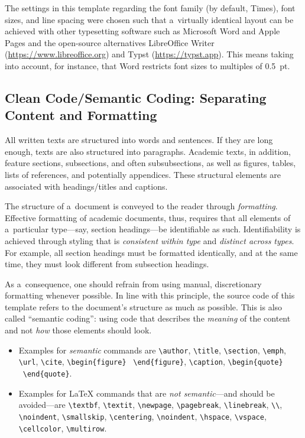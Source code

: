 \documentclass[12pt, a4paper, oneside]{article}
\newlength{\smalllinespacing}
\renewenvironment{quote}{%
	\par\list{}{%
		\leftmargin = \baselineskip%
		\rightmargin = \leftmargin%
		\baselineskip = \smalllinespacing%
	}
	\item\relax%
}{%
	\endlist%
}
\theoremstyle{Plain}
\theoremstyle{Definition}
\theoremstyle{Remark}
\let \cite \textcite
\begin{document}
The settings in this template regarding the font family (by default, Times), font sizes, and line spacing were chosen such that a~virtually identical layout can be achieved with other typesetting software such as Microsoft Word and Apple Pages and the open-source alternatives Libre\-Office Writer (\url{https://www.libreoffice.org}) and Typst (\url{https://typst.app}). This means taking into account, for instance, that Word restricts font sizes to multiples of 0.5~pt.

\subsection{Clean Code/Semantic Coding: Separating Content and Formatting}

All written texts are structured into words and sentences. If they are long enough, texts are also structured into paragraphs. Academic texts, in addition, feature sections, subsections, and often subsubsections, as well as figures, tables, lists of references, and potentially appendices. These structural elements are associated with headings\slash titles and captions.

The structure of a~document is conveyed to the reader through \emph{formatting}. Effective formatting of academic documents, thus, requires that all elements of a~particular type---say, section headings---be identifiable as such. Identifiability is achieved through styling that is \emph{consistent within type} and \emph{distinct across types}. For example, all section headings must be formatted identically, and at the same time, they must look different from subsection headings.

As a~consequence, one should refrain from using manual, discretionary formatting whenever possible. In line with this principle, the source code of this template refers to the document's structure as much as possible. This is also called ``semantic coding'': using code that describes the \emph{meaning} of the content and not \emph{how} those elements should look.
\begin{itemize}
	\item Examples for \emph{semantic} commands are \verb|\author|, \verb|\title|, \verb|\section|,  \verb|\emph|, \verb|\url|, \verb|\cite|, \verb|\begin{figure}| \textellipsis\ \verb|\end{figure}|, \verb|\caption|, \verb|\begin{quote}| \textellipsis\ \verb|\end{quote}|.
	\item Examples for LaTeX commands that are \emph{not semantic}---and should be avoided---are \verb|\textbf|, \verb|\textit|, \verb|\newpage|, \verb|\pagebreak|, \verb|\linebreak|, \verb|\\|, \verb|\noindent|, \verb|\smallskip|, \verb|\centering|, \verb|\noindent|, \verb|\hspace|, \verb|\vspace|, \verb|\cellcolor|, \verb|\multirow|.
\end{itemize}
\end{document}
